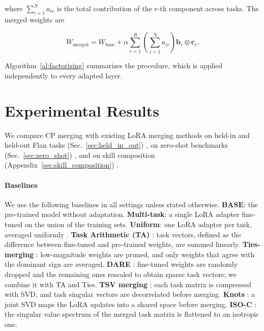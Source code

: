 \documentclass[10pt]{article} %
\begin{document}
    where $\sum_{i=1}^{N}a_{ir}$ is the total contribution of the $r$-th component
    across tasks. The merged weights are

    \begin{equation}
        W_{\text{merged}}=W_{\text{base}}+\alpha\sum_{r=1}^{R}\left( \sum_{i=1}^{N}a_{ir}\right) \mathbf
        {b}_{r}\otimes \mathbf{c}_{r}.
    \end{equation}

    Algorithm~\ref{al:factorizing} summarizes the procedure, which is applied independently to every adapted layer.

\section{Experimental Results}

    We compare CP merging with existing LoRA merging methods on held-in and held-out Flan tasks (Sec.~\ref{sec:held_in_out}) \citep{arnobexploring,ostapenko2024towards}, on zero-shot benchmarks (Sec.~\ref{sec:zero_shot}) \citep{ostapenko2024towards}, and on skill composition (Appendix~\ref{sec:skill_composition}) \citep{prabhakar2025lora}.

    \paragraph{Baselines}
    We use the following baselines in all settings unless stated otherwise. \textbf{BASE}: the
    pre-trained model without adaptation. \textbf{Multi-task}: a single LoRA
    adapter fine-tuned on the union of the training sets. \textbf{Uniform}:
    one LoRA adapter per task, averaged uniformly
    \citep{huang2023lorahub,chronopoulou2023adaptersoup}. \textbf{Task
    Arithmetic (TA)} \citep{ilharco2022editing}: task vectors, defined as the
    difference between fine-tuned and pre-trained weights, are summed linearly.
    \textbf{Ties-merging} \citep{yadav2023ties}: low-magnitude weights are pruned,
    and only weights that agree with the dominant sign are averaged. \textbf{DARE}
    \citep{yu2024language}: fine-tuned weights are randomly dropped and the
    remaining ones rescaled to obtain sparse task vectors; we combine it with
    TA and Ties. \textbf{TSV merging} \citep{gargiulo2025task}: each task matrix
    is compressed with SVD, and task singular vectors are decorrelated before
    merging. \textbf{Knots} \citep{stoica2025model}: a joint SVD maps the LoRA
    updates into a shared space before merging. \textbf{ISO-C}
    \citep{marczak2025no}: the singular value spectrum of the merged task
    matrix is flattened to an isotropic one.
    
\end{document}
